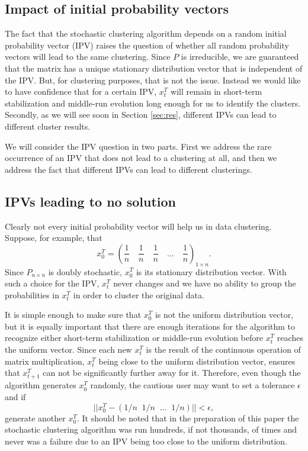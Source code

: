 \documentclass[final]{siamltex}
\begin{document}
\subsection{Impact of initial probability vectors}  \label{sec:ipvds}

The fact that the stochastic clustering algorithm depends on a random initial probability vector (IPV) raises the question of whether all random probability vectors will lead to the same clustering. Since $P$ is irreducible, we are guaranteed that the matrix has a unique stationary distribution vector that is independent of the IPV. But, for clustering purposes, that is not the issue. Instead we would like to have confidence that for a certain IPV, $x_{t}^{T}$ will remain in short-term stabilization and middle-run evolution long enough for us to identify the clusters. Secondly, as we will see soon in Section \ref{sec:res}, different IPVs can lead to different cluster results.

We will consider the IPV question in two parts. First we address the rare occurrence of an IPV that does not lead to a clustering at all, and then we address the fact that different IPVs can lead to different clusterings.

\subsection{IPVs leading to no solution}
Clearly not every initial probability vector will help us in data clustering. Suppose, for example, that 
$$
x_{0}^{T} = \left( \frac{1}{n} \quad  \frac{1}{n} \quad \frac{1}{n} \quad \dots  \quad \frac{1}{n}  \right)_{1 \times n}.
$$
Since $P_{n \times n}$ is doubly stochastic, $x_{0}^{T}$ is its stationary distribution vector. With such a choice for the IPV, $x_{t}^{T}$ never changes and we have no ability to group the probabilities in $x_{t}^{T}$ in order to cluster the original data.

It is simple enough to make sure that $x_{0}^{T}$ is not the uniform distribution vector, but it is equally important that there are enough iterations for the algorithm to recognize either short-term stabilization or middle-run evolution before $x_{t}^{T}$ reaches the uniform vector. Since each new $x_{t}^{T}$ is the result of the continuous operation of matrix multiplication, $x_{t}^{T}$ being close to the uniform distribution vector, ensures that $x_{t+1}^{T}$ can not be significantly further away for it. Therefore, even though the algorithm generates $x_{0}^{T}$ randomly, the cautious user may want to set a tolerance $\epsilon$ and if
\[
|| x_{0}^{T} - (1/n \;\; 1/n \;\; \dots \;\; 1/n) || < \epsilon,
\]
generate another $x_{0}^{T}$. It should be noted that in the preparation of this paper the stochastic clustering algorithm was run hundreds, if not thousands, of times and never was a failure due to an IPV being too close to the uniform distribution.
\end{document}
